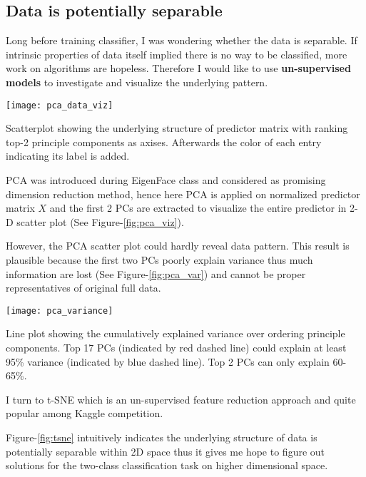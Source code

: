 \subsection{Data is potentially separable}

Long before training classifier, I was wondering whether the data is separable. If intrinsic properties of data itself implied there is no way to be classified, more work on algorithms are hopeless. Therefore I would like to use \textbf{un-supervised models} to investigate and visualize the underlying pattern. 

\begin{marginfigure}
\centering
	\texttt{[image: pca\_data\_viz]}
	\caption{Scatterplot showing the underlying structure of predictor matrix with ranking top-2 principle components as axises. Afterwards the color of each entry indicating its label is added. }
	\label{fig:pca_viz}
\end{marginfigure}

PCA was introduced during EigenFace class and considered as promising dimension reduction method, hence here PCA is applied on normalized predictor matrix $X$ and the first 2 PCs are extracted to visualize the entire predictor in 2-D scatter plot (See Figure-\ref{fig:pca_viz}). 

However, the PCA scatter plot could hardly reveal data pattern. This result is plausible because the first two PCs poorly explain variance thus much information are lost (See Figure-\ref{fig:pca_var}) and cannot be proper representatives of original full data. 

\begin{marginfigure}
\centering
	\texttt{[image: pca\_variance]}
	\caption{Line plot showing the cumulatively explained variance over ordering principle components. Top 17 PCs (indicated by red dashed line) could explain at least 95\% variance (indicated by blue dashed line). Top 2 PCs can only explain 60-65\%.}
	\label{fig:pca_var}
\end{marginfigure}

I turn to t-SNE which is an un-supervised feature reduction approach and quite popular among Kaggle competition. 


Figure-\ref{fig:tsne} intuitively indicates the underlying structure of data is potentially separable within 2D space thus it gives me hope to figure out solutions for the two-class classification task on higher dimensional space.  

